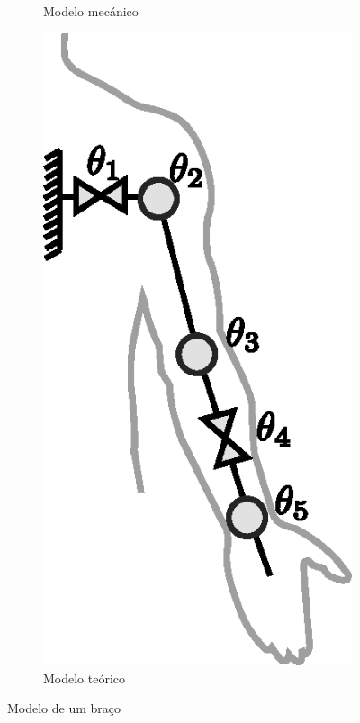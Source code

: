 \begin{figure}[!ht]
\begin{subfigure}[b]{0.31\textwidth}
         \caption{Modelo mecánico}
         \label{fig:modelobrazo2}
     \end{subfigure}
     \hfill
     \begin{subfigure}[b]{0.31\textwidth}
         \centering
         \includegraphics[width=\textwidth]{chapters/cap-normas/brazo3.eps}
         \caption{Modelo teórico}
         \label{fig:modelobrazo3}
     \end{subfigure}
\caption{Modelo de um braço}
\label{fig:modelobrazo}
\end{figure}

